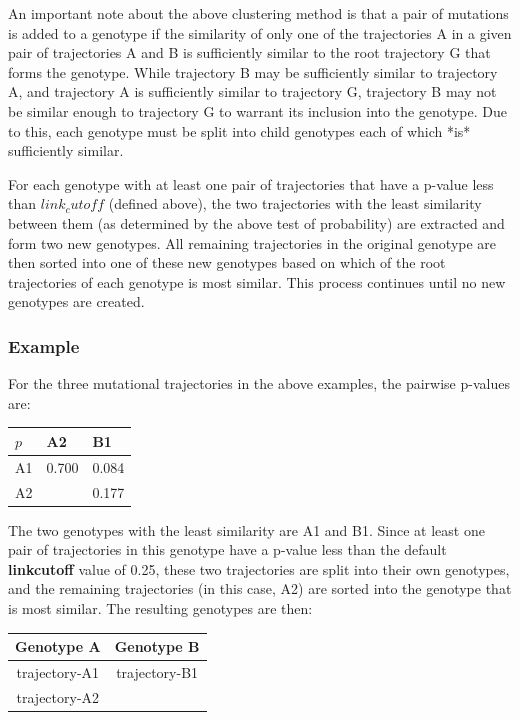 \documentclass{report}
\begin{document}
An important note about the above clustering method is that a pair of mutations is added to a genotype if the similarity of only one of the trajectories A in a given pair of trajectories A and B is sufficiently similar to the root trajectory G that forms the genotype. While trajectory B may be sufficiently similar to trajectory A, and trajectory A is sufficiently similar to trajectory G, trajectory B may not be similar enough to trajectory G to warrant its inclusion into the genotype. Due to this, each genotype must be split into child genotypes each of which *is* sufficiently similar.

For each genotype with at least one pair of trajectories that have a p-value less than $link_cutoff$ (defined above),
the two trajectories with the least similarity between them (as determined by the above test of probability) are extracted and form two new genotypes.
All remaining trajectories in the original genotype are then sorted into one of these new genotypes based on which of the root trajectories of each genotype is
most similar. This process continues until no new genotypes are created.

\subsubsection{Example}

For the three mutational trajectories in the above examples, the pairwise p-values are:
\begin{table}[H]
  \begin{center}
  \begin{tabular}{l|ll}
    $p$ & A2 & B1 \\
    \hline
    A1 & 0.700 & 0.084 \\
    A2 &       & 0.177 \\
  \end{tabular}
\end{center}
\end{table}

The two genotypes with the least similarity are A1 and B1. Since at least one pair of trajectories in this genotype have a p-value less than the default \textbf{linkcutoff} value of 0.25, these two trajectories are split into their own genotypes, and the remaining trajectories (in this case, A2) are sorted into the genotype that is most similar. The resulting genotypes are then:

\begin{table}[H]
  \begin{center}
    \begin{tabular}{c|c}
    Genotype A & Genotype B \\
    \hline
    trajectory-A1 & trajectory-B1 \\
    trajectory-A2 &  \\
    \end{tabular}
  \end{center}
\end{table}
\end{document}

